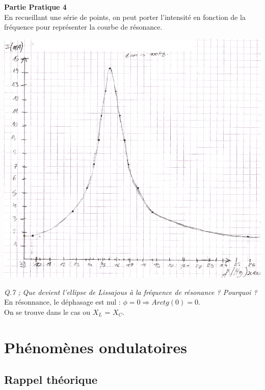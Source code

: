 \documentclass	[11pt, a4paper, openany]{book}
\begin{document}
		\textbf{Partie Pratique 4}\\
		En recueillant une série de points, on peut porter l'intensité en fonction de la fréquence pour représenter la courbe de résonance.
		\begin{center}
			\includegraphics[scale=0.5]{labo/image35.png}
		\end{center}
		\textit{Q.7 ; Que devient l'ellipse de Lissajous à la fréquence de résonance ? Pourquoi ?}\\
		En résonnance, le déphasage est nul : $\phi = 0 \Rightarrow Arctg(0) = 0$.\\
		On se trouve dans le cas ou $X_L$ = $X_C$.
		
		
		
		
		
		
		
		
		
		
		
		
		
		\newpage
		\section{Phénomènes ondulatoires}
		\subsection{Rappel théorique}
\end{document}
